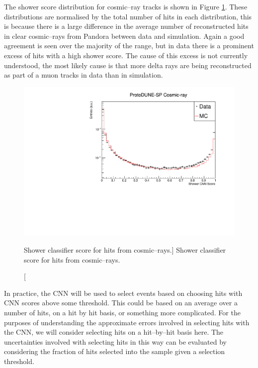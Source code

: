 The shower score distribution for cosmic--ray tracks is shown in Figure
\ref{fig:cosmic_muon_cnn}. These distributions are normalised by the total
number of hits in each distribution, this is because there is a large difference
in the average number of reconstructed hits in clear cosmic--rays from Pandora
between data and simulation.  Again a good agreement is seen over the majority 
of the range, but in data there is a prominent excess of hits with a high 
shower score. The cause of this excess is not currently understood, the most 
likely cause is that more delta rays are being reconstructed as part of a muon 
tracks in data than in simulation.
\begin{figure}
	\centering
	\includegraphics[width=\textwidth]{figures/hit_cnn_cosmics.pdf}
	\caption
	[Shower classifier score for hits from cosmic--rays.]
	{Shower classifier score for hits from cosmic--rays.}
	\label{fig:cosmic_muon_cnn}
\end{figure}

In practice, the CNN will be used to select events based on choosing hits with 
CNN scores above some threshold. This could be based on an average over a 
number of hits, on a hit by hit basis, or something more complicated. For the
purposes of understanding the approximate errors involved in selecting hits with
the CNN, we will consider selecting hits on a hit--by--hit basis here.  The 
uncertainties involved with selecting hits in this way can be evaluated by 
considering the fraction of hits selected into the sample given a selection 
threshold. 

